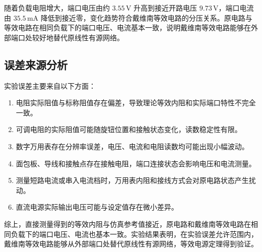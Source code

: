 随着负载电阻增大，端口电压由约 \(3.55\,\mathrm{V}\) 升高到接近开路电压 \(9.73\,\mathrm{V}\)，端口电流由 \(35.5\,\mathrm{mA}\) 降低到接近零，变化趋势符合戴维南等效电路的分压关系。原电路与等效电路在相同负载下的端口电压、电流基本一致，说明戴维南等效电路能够在外部端口处较好地替代原线性有源网络。

\subsection{误差来源分析}

实验误差主要来自以下方面：
\begin{enumerate}[label=\arabic*.]
    \item 电阻实际阻值与标称阻值存在偏差，导致理论等效内阻和实际端口特性不完全一致。
    \item 可调电阻的实际阻值可能随旋钮位置和接触状态变化，读数稳定性有限。
    \item 数字万用表存在分辨率误差，电压、电流和电阻读数均可能出现小幅波动。
    \item 面包板、导线和接触点存在接触电阻，端口连接状态会影响电压和电流测量。
    \item 测量短路电流或串入电流档时，万用表内阻和接线方式会对原电路状态产生扰动。
    \item 直流电源实际输出电压可能与设定值存在微小差异。
\end{enumerate}

综上，直接测量得到的等效内阻与仿真参考值接近，原电路和戴维南等效电路在相同负载下的端口电压、电流也基本一致。实验结果表明，在实验误差允许范围内，戴维南等效电路能够从外部端口处替代原线性有源网络，等效电源定理得到验证。


